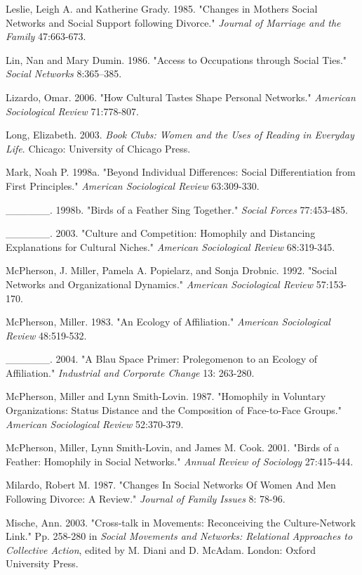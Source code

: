 Leslie, Leigh A. and Katherine Grady. 1985. "Changes in Mothers\textquotesingle{} Social Networks and Social Support following Divorce." \emph{Journal of Marriage and the Family} 47:663-673.

Lin, Nan and Mary Dumin. 1986. "Access to Occupations through Social Ties." \emph{Social Networks} 8:365--385.

Lizardo, Omar. 2006. "How Cultural Tastes Shape Personal Networks." \emph{American Sociological Review} 71:778-807.

Long, Elizabeth. 2003. \emph{Book Clubs: Women and the Uses of Reading in Everyday Life}. Chicago: University of Chicago Press.

Mark, Noah P. 1998a. "Beyond Individual Differences: Social Differentiation from First Principles." \emph{American Sociological Review} 63:309-330.

\_\_\_\_\_\_. 1998b. "Birds of a Feather Sing Together." \emph{Social Forces} 77:453-485.

\_\_\_\_\_\_. 2003. "Culture and Competition: Homophily and Distancing Explanations for Cultural Niches." \emph{American Sociological Review} 68:319-345.

McPherson, J. Miller, Pamela A. Popielarz, and Sonja Drobnic. 1992. "Social Networks and Organizational Dynamics." \emph{American Sociological Review} 57:153-170.

McPherson, Miller. 1983. "An Ecology of Affiliation." \emph{American Sociological Review} 48:519-532.

\_\_\_\_\_\_. 2004. "A Blau Space Primer: Prolegomenon to an Ecology of Affiliation." \emph{Industrial and Corporate Change} 13: 263-280.

McPherson, Miller and Lynn Smith-Lovin. 1987. "Homophily in Voluntary Organizations: Status Distance and the Composition of Face-to-Face Groups." \emph{American Sociological Review} 52:370-379.

McPherson, Miller, Lynn Smith-Lovin, and James M. Cook. 2001. "Birds of a Feather: Homophily in Social Networks." \emph{Annual Review of Sociology} 27:415-444.

Milardo, Robert M. 1987. "Changes In Social Networks Of Women And Men Following Divorce: A Review." \emph{Journal of Family Issues} 8: 78-96.

Mische, Ann. 2003. "Cross-talk in Movements: Reconceiving the Culture-Network Link." Pp. 258-280 in \emph{Social Movements and Networks: Relational Approaches to Collective Action}, edited by M. Diani and D. McAdam. London: Oxford University Press.

